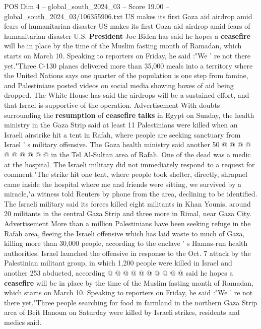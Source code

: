 \begin{textsample}{POS Dim 4 – global\_south\_2024\_03 – Score 19.00 – global\_south\_2024\_03/106355906.txt}  \label{ex:f4_pos_107}
US makes its first Gaza aid airdrop amid fears of humanitarian disaster US makes its first Gaza aid airdrop amid fears of humanitarian disaster U.S. \textbf{President} Joe Biden has said he hopes a \textbf{ceasefire} will be in place by the time of the Muslim fasting month of Ramadan, which starts on March 10.
Speaking to reporters on Friday, he said :"We ' re not there yet."Three C-130 planes delivered more than 35,000 meals into a territory where the United Nations says one quarter of the population is one step from famine, and Palestinians posted videos on social media showing boxes of aid being dropped.
The White House has said the airdrops will be a sustained effort, and that Israel is supportive of the operation.
Advertisement With doubts surrounding the \textbf{resumption} of \textbf{ceasefire} \textbf{talks} in Egypt on Sunday, the health ministry in the Gaza Strip said at least 11 Palestinians were killed when an Israeli airstrike hit a tent in Rafah, where people are seeking sanctuary from Israel ' s military offensive.
The Gaza health ministry said another 50 @ @ @ @ @ @ @ @ @ @ in the Tel Al-Sultan area of Rafah.
One of the dead was a medic at the hospital.
The Israeli military did not immediately respond to a request for comment."The strike hit one tent, where people took shelter, directly, shrapnel came inside the hospital where me and friends were sitting, we survived by a miracle,"a witness told Reuters by phone from the area, declining to be identified.
The Israeli military said its forces killed eight militants in Khan Younis, around 20 militants in the central Gaza Strip and three more in Rimal, near Gaza City.
Advertisement More than a million Palestinians have been seeking refuge in the Rafah area, fleeing the Israeli offensive which has laid waste to much of Gaza, killing more than 30,000 people, according to the enclave ' s Hamas-run health authorities.
Israel launched the offensive in response to the Oct. 7 attack by the Palestinian militant group, in which 1,200 people were killed in Israel and another 253 abducted, according @ @ @ @ @ @ @ @ @ @ said he hopes a \textbf{ceasefire} will be in place by the time of the Muslim fasting month of Ramadan, which starts on March 10.
Speaking to reporters on Friday, he said :"We ' re not there yet."Three people searching for food in farmland in the northern Gaza Strip area of Beit Hanoun on Saturday were killed by Israeli strikes, residents and medics said.

\end{textsample}
